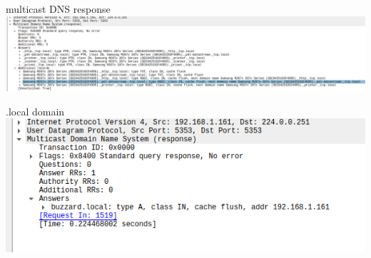 \begin{frame}[fragile]{multicast DNS response}
\includegraphics[width=\textwidth]{../sockets/mdns-response}
\end{frame}

\begin{frame}{.local domain}
\includegraphics[height=0.85\textheight]{../sockets/unsolict-local-mdns}
\end{frame}
